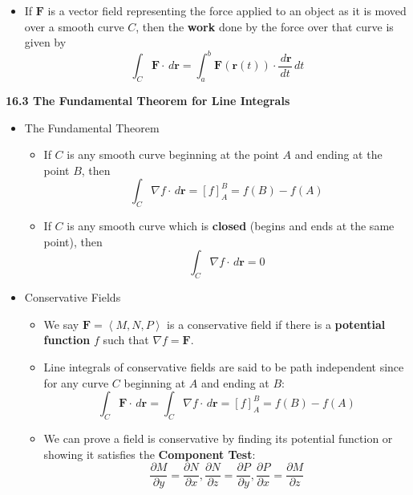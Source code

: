 \documentclass[12pt]{article}
\renewcommand{\vec}[1]{\mathbf{#1}}
\newcommand{\dvar}[1]{\,d{#1}}
\renewcommand{\d}[1]{\dvar{#1}}
\newcommand{\<}{\left<}
\renewcommand{\>}{\right>}
\newcommand{\p}{\partial}
\begin{document}
\begin{itemize}
    \begin{itemize}
      \item If $\vec{F}$ is a vector field representing the force applied to an object as it is moved over a smooth curve $C$, then the \textbf{work} done by the force over that curve is given by
        \[
          \int_C \vec{F}\cdot\d{\vec{r}} = \int_a^b \vec{F}(\vec{r}(t))\cdot\frac{\d{\vec{r}}}{dt}\d{t}
        \]
    \end{itemize}
        
  
    
  \end{itemize}

\newpage

\centerline{\bf 16.3 The Fundamental Theorem for Line Integrals}

  \begin{itemize}

  \item The Fundamental Theorem
    \begin{itemize}
      \item If $C$ is any smooth curve beginning at the point $A$ and ending at the point $B$, then
        \[
          \int_C \nabla f\cdot \d{\vec{r}} = \left[f\right]_A^B = f(B)-f(A)
        \]
      \item If $C$ is any smooth curve which is \textbf{closed} (begins and ends at the same point), then
        \[
          \int_C \nabla f\cdot \d{\vec{r}} = 0
        \]
    \end{itemize}

  \item Conservative Fields
    \begin{itemize}
      \item We say $\vec{F}=\<M,N,P\>$ is a conservative field if there is a \textbf{potential function} $f$ such that $\nabla f = \vec{F}$.
      \item Line integrals of conservative fields are said to be path independent since for any curve $C$ beginning at $A$ and ending at $B$:
        \[
          \int_C \vec{F}\cdot \d{\vec{r}} = \int_C \nabla f\cdot \d{\vec{r}} = \left[f\right]_A^B = f(B)-f(A)
        \]
      \item We can prove a field is conservative by finding its potential function or showing it satisfies the \textbf{Component Test}:
        \[
          \frac{\p M}{\p y}=\frac{\p N}{\p x}, \frac{\p N}{\p z}=\frac{\p P}{\p y}, \frac{\p P}{\p x}=\frac{\p M}{\p z}
        \]
    \end{itemize}

  \end{itemize}
  
\end{document}
